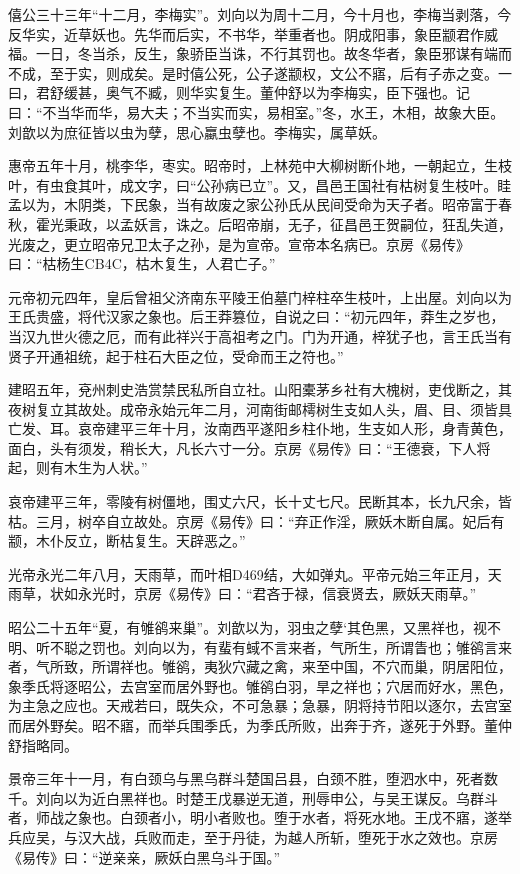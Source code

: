 \documentclass[]{article}
\begin{document}
僖公三十三年``十二月，李梅实''。刘向以为周十二月，今十月也，李梅当剥落，今反华实，近草妖也。先华而后实，不书华，举重者也。阴成阳事，象臣颛君作威福。一日，冬当杀，反生，象骄臣当诛，不行其罚也。故冬华者，象臣邪谋有端而不成，至于实，则成矣。是时僖公死，公子遂颛权，文公不寤，后有子赤之变。一曰，君舒缓甚，奥气不臧，则华实复生。董仲舒以为李梅实，臣下强也。记曰：``不当华而华，易大夫；不当实而实，易相室。''冬，水王，木相，故象大臣。刘歆以为庶征皆以虫为孽，思心蠃虫孽也。李梅实，属草妖。

惠帝五年十月，桃李华，枣实。昭帝时，上林苑中大柳树断仆地，一朝起立，生枝叶，有虫食其叶，成文字，曰``公孙病已立''。又，昌邑王国社有枯树复生枝叶。眭孟以为，木阴类，下民象，当有故废之家公孙氏从民间受命为天子者。昭帝富于春秋，霍光秉政，以孟妖言，诛之。后昭帝崩，无子，征昌邑王贺嗣位，狂乱失道，光废之，更立昭帝兄卫太子之孙，是为宣帝。宣帝本名病已。京房《易传》曰：``枯杨生CB4C，枯木复生，人君亡子。''

元帝初元四年，皇后曾祖父济南东平陵王伯墓门梓柱卒生枝叶，上出屋。刘向以为王氏贵盛，将代汉家之象也。后王莽篡位，自说之曰：``初元四年，莽生之岁也，当汉九世火德之厄，而有此祥兴于高祖考之门。门为开通，梓犹子也，言王氏当有贤子开通祖统，起于柱石大臣之位，受命而王之符也。''

建昭五年，兗州刺史浩赏禁民私所自立社。山阳橐茅乡社有大槐树，吏伐断之，其夜树复立其故处。成帝永始元年二月，河南街邮樗树生支如人头，眉、目、须皆具亡发、耳。哀帝建平三年十月，汝南西平遂阳乡柱仆地，生支如人形，身青黄色，面白，头有须发，稍长大，凡长六寸一分。京房《易传》曰：``王德衰，下人将起，则有木生为人状。''

哀帝建平三年，零陵有树僵地，围丈六尺，长十丈七尺。民断其本，长九尺余，皆枯。三月，树卒自立故处。京房《易传》曰：``弃正作淫，厥妖木断自属。妃后有颛，木仆反立，断枯复生。天辟恶之。''

光帝永光二年八月，天雨草，而叶相D469结，大如弹丸。平帝元始三年正月，天雨草，状如永光时，京房《易传》曰：``君吝于禄，信衰贤去，厥妖天雨草。''

昭公二十五年``夏，有雊鹆来巢''。刘歆以为，羽虫之孽`其色黑，又黑祥也，视不明、听不聪之罚也。刘向以为，有蜚有蜮不言来者，气所生，所谓眚也；雊鹆言来者，气所致，所谓祥也。雊鹆，夷狄穴藏之禽，来至中国，不穴而巢，阴居阳位，象季氏将逐昭公，去宫室而居外野也。雊鹆白羽，旱之祥也；穴居而好水，黑色，为主急之应也。天戒若曰，既失众，不可急暴；急暴，阴将持节阳以逐尔，去宫室而居外野矣。昭不寤，而举兵围季氏，为季氏所败，出奔于齐，遂死于外野。董仲舒指略同。

景帝三年十一月，有白颈乌与黑乌群斗楚国吕县，白颈不胜，堕泗水中，死者数千。刘向以为近白黑祥也。时楚王戊暴逆无道，刑辱申公，与吴王谋反。乌群斗者，师战之象也。白颈者小，明小者败也。堕于水者，将死水地。王戊不寤，遂举兵应吴，与汉大战，兵败而走，至于丹徒，为越人所斩，堕死于水之效也。京房《易传》曰：``逆亲亲，厥妖白黑乌斗于国。''
\end{document}
